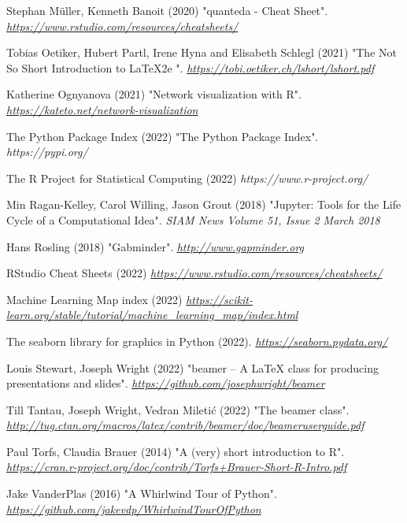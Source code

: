 \documentclass{beamer}
\begin{document}
\begin{frame}[allowframebreaks]
{\begin{thebibliography}{99}
 Stephan M\"{u}ller, Kenneth Banoit (2020)
\newblock "quanteda - Cheat Sheet".
\newblock \emph{\url{https://www.rstudio.com/resources/cheatsheets/}}

 Tobias Oetiker, Hubert Partl, Irene Hyna and Elisabeth Schlegl (2021)
\newblock "The Not So Short Introduction to \LaTeX2e ".
\newblock \emph{\url{https://tobi.oetiker.ch/lshort/lshort.pdf}}

 Katherine Ognyanova (2021)
\newblock "Network visualization with R".
\newblock \emph{\url{https://kateto.net/network-visualization}}

 The Python Package Index (2022)
\newblock "The Python Package Index".
\newblock \emph{https://pypi.org/}

 The R Project for Statistical Computing (2022)
\newblock \emph{https://www.r-project.org/}

 Min Ragan-Kelley, Carol Willing, Jason Grout (2018)
\newblock "Jupyter: Tools for the Life Cycle of a Computational Idea".
\newblock \emph{SIAM News Volume 51, Issue 2 March 2018}

 Hans Rosling (2018)
\newblock "Gabminder".
\newblock \emph{\url{http://www.gapminder.org}}

 RStudio Cheat Sheets (2022)
\newblock \emph{\url{https://www.rstudio.com/resources/cheatsheets/}}

 Machine Learning Map index (2022)
\newblock \emph{\url{https://scikit-learn.org/stable/tutorial/machine_learning_map/index.html}}

 The seaborn library for graphics in Python (2022).
\newblock \emph{\url{https://seaborn.pydata.org/}}

 Louis Stewart, Joseph Wright (2022)
\newblock "beamer – A LaTeX class for producing presentations and slides".
\newblock \emph{\url{https://github.com/josephwright/beamer}}

 Till Tantau, Joseph Wright, Vedran Mileti\'{c} (2022)
\newblock "The beamer class".
\newblock \emph{\url{http://tug.ctan.org/macros/latex/contrib/beamer/doc/beameruserguide.pdf}}


 Paul Torfs, Claudia Brauer (2014)
\newblock "A (very) short introduction to R".
\newblock \emph{\url{https://cran.r-project.org/doc/contrib/Torfs+Brauer-Short-R-Intro.pdf}}

 Jake VanderPlas (2016)
\newblock "A Whirlwind Tour of Python".
\newblock \emph{\url{https://github.com/jakevdp/WhirlwindTourOfPython}}

\end{thebibliography}
}
\end{frame}

\end{document}
